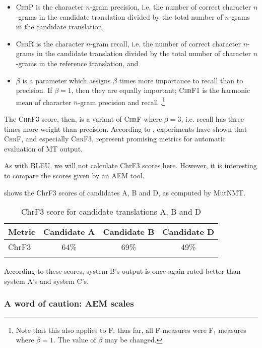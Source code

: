 \documentclass[output=paper]{langscibook}
\begin{document}
\begin{itemize}
\item \textsc{ChrP} is the character $n$-gram precision, i.e. the number of correct character $n$-grams in the candidate translation divided by the total number of $n$-grams in the candidate translation,
\item \textsc{ChrR} is the character $n$-gram recall, i.e. the number of correct character $n$-grams in the candidate translation divided by the total number of character $n$-grams in the reference translation, and
\item $\beta$ is a parameter which assigns $\beta$ times more importance to recall than to precision. If $\beta = 1$, then they are equally important; \textsc{ChrF1} is the harmonic mean of character $n$-gram precision and recall \citep{Popović2015}.\footnote{Note that this also applies to F: thus far, all F-measures were F₁ measures where $\beta =1$. The value of $\beta$ may be changed.}
\end{itemize}

The \textsc{ChrF3} score, then, is a variant of \textsc{ChrF} where $\beta = 3$, i.e. recall has three times more weight than precision. According to \citet{Popović2015}, experiments have shown that \textsc{ChrF}, and especially \textsc{ChrF3}, represent promising metrics for automatic evaluation of MT output.

As with BLEU, we will not calculate ChrF3 scores here. However, it is interesting to compare the scores given by an AEM tool.

 shows the ChrF3 scores of candidates A, B and D, as computed by MutNMT.


\begin{table}
\begin{tabular}{lccc}
\lsptoprule
{Metric} & {Candidate A} & {Candidate B} & {Candidate D}\\
\midrule
ChrF3 & 64\% & 69\% & 49\%\\
\lspbottomrule
\end{tabular}
\caption{ChrF3 score for candidate translations A, B and D\label{tab:rossi:14}}
\end{table}

According to these scores, system B’s output is once again rated better than system A’s and system C’s.

\subsubsection{A word of caution: AEM scales}
\end{document}
